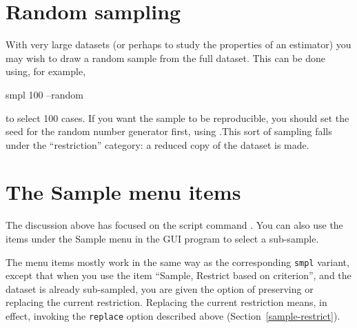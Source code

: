 \section{Random sampling}
\label{sample-random}

With very large datasets (or perhaps to study the properties of an
estimator) you may wish to draw a random sample from the full dataset.
This can be done using, for example,
%
\begin{code}
    smpl 100 --random
\end{code}
%
to select 100 cases.  If you want the sample to be reproducible, you
should set the seed for the random number generator first, using
.This sort of sampling falls under the ``restriction''
category: a reduced copy of the dataset is made.

\section{The Sample menu items}
\label{sample-menu}

The discussion above has focused on the script command . You
can also use the items under the \textsf{Sample} menu in the GUI
program to select a sub-sample.

The menu items mostly work in the same way as the corresponding
\verb+smpl+ variant, except that when you use the item ``Sample,
Restrict based on criterion'', and the dataset is already sub-sampled,
you are given the option of preserving or replacing the current
restriction.  Replacing the current restriction means, in effect,
invoking the \verb+replace+ option described above
(Section~\ref{sample-restrict}).
    

